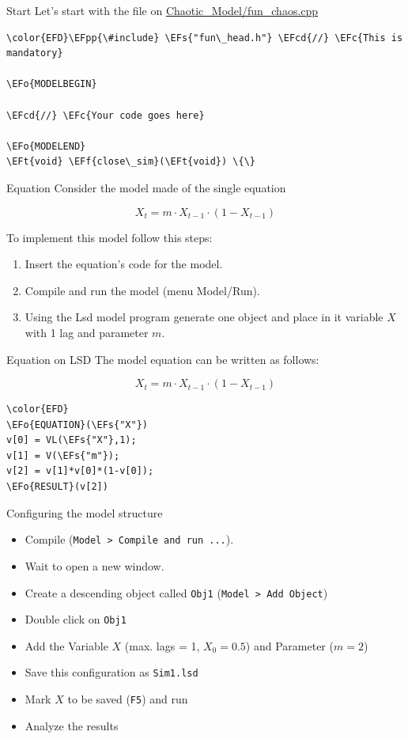 \documentclass[bigger,aspectratio=169]{beamer}
\newcommand{\EFc}[1]{\textcolor{EFc}{#1}} %
\newcommand{\EFcd}[1]{\textcolor{EFcd}{#1}} %
\newcommand{\EFs}[1]{\textcolor{EFs}{#1}} %
\newcommand{\EFf}[1]{\textcolor{EFf}{#1}} %
\newcommand{\EFt}[1]{\textcolor{EFt}{#1}} %
\newcommand{\EFo}[1]{\textcolor{EFo}{#1}} %
\newcommand{\EFpp}[1]{\textcolor{EFpp}{\textbf{#1}}} %
\begin{document}
\begin{frame}[label={sec:orga13279c},fragile]{Start}
 Let's start with the file on \url{Chaotic\_Model/fun\_chaos.cpp}


\begin{Code}
\begin{Verbatim}
\color{EFD}\EFpp{\#include} \EFs{"fun\_head.h"} \EFcd{//} \EFc{This is mandatory}

\EFo{MODELBEGIN}

\EFcd{//} \EFc{Your code goes here}

\EFo{MODELEND}
\EFt{void} \EFf{close\_sim}(\EFt{void}) \{\}
\end{Verbatim}
\end{Code}
\end{frame}
\begin{frame}[label={sec:org4745719}]{Equation}
Consider the model made of the single equation

\[X_{t} = m\cdot X_{t-1}\cdot (1 - X_{t-1})\]

To implement this model follow this steps:
\begin{enumerate}
\item Insert the equation’s code for the model.
\item Compile and run the model (menu \alert{Model/Run}).
\item Using the Lsd model program generate one object and place in it variable \(X\) with 1 lag and parameter \(m\).
\end{enumerate}
\end{frame}
\begin{frame}[label={sec:org61fa720},fragile]{Equation on LSD}
 The model equation can be written as follows:

\[X_{t} = m\cdot X_{t-1}\cdot (1 - X_{t-1})\]

\begin{Code}
\begin{Verbatim}
\color{EFD}
\EFo{EQUATION}(\EFs{"X"})
v[0] = VL(\EFs{"X"},1);
v[1] = V(\EFs{"m"});
v[2] = v[1]*v[0]*(1-v[0]);
\EFo{RESULT}(v[2])
\end{Verbatim}
\end{Code}
\end{frame}
\begin{frame}[label={sec:org154a0f1},fragile]{Configuring the model structure}
 \begin{itemize}
\item Compile (\texttt{Model > Compile and run ...}).
\item Wait to open a new window.
\item Create a descending object called \texttt{Obj1} (\texttt{Model > Add Object})
\item Double click on \texttt{Obj1}
\item Add the Variable \(X\) (max. lags = 1, \(X_{0} = 0.5\)) and Parameter (\(m = 2\))
\item Save this configuration as \texttt{Sim1.lsd}
\item Mark \(X\) to be saved (\texttt{F5}) and run
\item Analyze the results
\end{itemize}
\end{frame}
\end{document}
